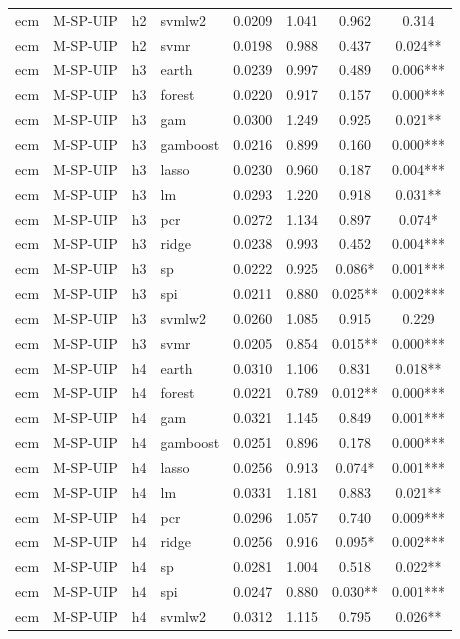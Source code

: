 \begin{ThreePartTable}
\begin{longtable}[t]{llclcccc}
ecm & M-SP-UIP & h2 & svmlw2 & 0.0209 & 1.041 & 0.962 & 0.314\\
ecm & M-SP-UIP & h2 & svmr & 0.0198 & 0.988 & 0.437 & 0.024**\\
\addlinespace
ecm & M-SP-UIP & h3 & earth & 0.0239 & 0.997 & 0.489 & 0.006***\\
ecm & M-SP-UIP & h3 & forest & 0.0220 & 0.917 & 0.157 & 0.000***\\
ecm & M-SP-UIP & h3 & gam & 0.0300 & 1.249 & 0.925 & 0.021**\\
ecm & M-SP-UIP & h3 & gamboost & 0.0216 & 0.899 & 0.160 & 0.000***\\
ecm & M-SP-UIP & h3 & lasso & 0.0230 & 0.960 & 0.187 & 0.004***\\
ecm & M-SP-UIP & h3 & lm & 0.0293 & 1.220 & 0.918 & 0.031**\\
ecm & M-SP-UIP & h3 & pcr & 0.0272 & 1.134 & 0.897 & 0.074*\\
ecm & M-SP-UIP & h3 & ridge & 0.0238 & 0.993 & 0.452 & 0.004***\\
ecm & M-SP-UIP & h3 & sp & 0.0222 & 0.925 & 0.086* & 0.001***\\
ecm & M-SP-UIP & h3 & spi & 0.0211 & 0.880 & 0.025** & 0.002***\\
ecm & M-SP-UIP & h3 & svmlw2 & 0.0260 & 1.085 & 0.915 & 0.229\\
ecm & M-SP-UIP & h3 & svmr & 0.0205 & 0.854 & 0.015** & 0.000***\\
\addlinespace
ecm & M-SP-UIP & h4 & earth & 0.0310 & 1.106 & 0.831 & 0.018**\\
ecm & M-SP-UIP & h4 & forest & 0.0221 & 0.789 & 0.012** & 0.000***\\
ecm & M-SP-UIP & h4 & gam & 0.0321 & 1.145 & 0.849 & 0.001***\\
ecm & M-SP-UIP & h4 & gamboost & 0.0251 & 0.896 & 0.178 & 0.000***\\
ecm & M-SP-UIP & h4 & lasso & 0.0256 & 0.913 & 0.074* & 0.001***\\
ecm & M-SP-UIP & h4 & lm & 0.0331 & 1.181 & 0.883 & 0.021**\\
ecm & M-SP-UIP & h4 & pcr & 0.0296 & 1.057 & 0.740 & 0.009***\\
ecm & M-SP-UIP & h4 & ridge & 0.0256 & 0.916 & 0.095* & 0.002***\\
ecm & M-SP-UIP & h4 & sp & 0.0281 & 1.004 & 0.518 & 0.022**\\
ecm & M-SP-UIP & h4 & spi & 0.0247 & 0.880 & 0.030** & 0.001***\\
ecm & M-SP-UIP & h4 & svmlw2 & 0.0312 & 1.115 & 0.795 & 0.026**\\

\end{longtable}
\end{ThreePartTable}

